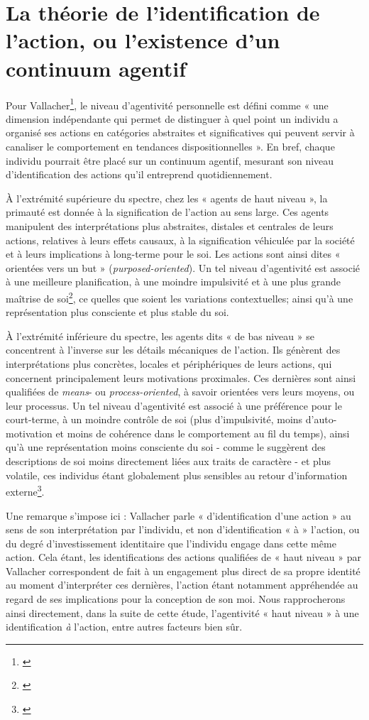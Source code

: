 \section{La théorie de l’identification de l’action, ou l’existence d’un continuum agentif}

Pour Vallacher\footnote{\cite{vallacher_levels_1989}}, le niveau d’agentivité personnelle est défini comme « une dimension indépendante qui permet de distinguer à quel point un individu a organisé ses actions en catégories abstraites et significatives qui peuvent servir à canaliser le comportement en tendances dispositionnelles ». En bref, chaque individu pourrait être placé sur un continuum agentif, mesurant son niveau d'identification des actions qu'il entreprend quotidiennement. 

À l'extrémité supérieure du spectre, chez les « agents de haut niveau », la primauté est donnée à la signification de l'action au sens large. Ces agents manipulent des interprétations plus abstraites, distales et centrales de leurs actions, relatives à leurs effets causaux, à la signification véhiculée par la société et à leurs implications à long-terme pour le soi. Les actions sont ainsi dites « orientées vers un but » (\textit{purposed-oriented}). Un tel niveau d’agentivité est associé à une meilleure planification, à une moindre impulsivité et à une plus grande maîtrise de soi\footnote{\cite{fujita_seeing_2008}}, ce quelles que soient les variations contextuelles; ainsi qu’à une représentation plus consciente et plus stable du soi. 

À l'extrémité inférieure du spectre, les agents dits « de bas niveau » se concentrent à l’inverse sur les détails mécaniques de l'action. Ils génèrent des interprétations plus concrètes, locales et périphériques de leurs actions, qui concernent principalement leurs motivations proximales. Ces dernières sont ainsi qualifiées de \textit{means}- ou \textit{process-oriented}, à savoir orientées vers leurs moyens, ou leur processus. Un tel niveau d’agentivité est associé à une préférence pour le court-terme, à un moindre contrôle de soi (plus d'impulsivité, moins d'auto-motivation et moins de cohérence dans le comportement au fil du temps), ainsi qu’à une représentation moins consciente du soi - comme le suggèrent des descriptions de soi moins directement liées aux traits de caractère - et plus volatile, ces individus étant globalement plus sensibles au retour d’information externe\footnote{\cite{fujita_seeing_2008}}.

Une remarque s’impose ici : Vallacher parle « d’identification d’une action » au sens de son interprétation par l'individu, et non d’identification « à » l’action, ou du degré d’investissement identitaire que l'individu engage dans cette même action. Cela étant, les identifications des actions qualifiées de « haut niveau » par Vallacher correspondent de fait à un engagement plus direct de sa propre identité au moment d'interpréter ces dernières, l’action étant notamment appréhendée au regard de ses implications pour la conception de son moi. Nous rapprocherons ainsi directement, dans la suite de cette étude, l’agentivité « haut niveau » à une identification \textit{à} l’action, entre autres facteurs bien sûr.

